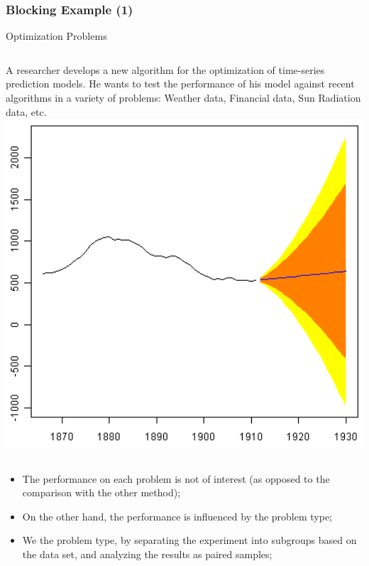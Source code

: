 \documentclass[10pt]{beamer}
\begin{document}
\begin{frame}
  \frametitle{Blocking Example (1)}
  \begin{block}{Optimization Problems}
    \begin{columns}[c]
      A researcher develops a new algorithm for the optimization of
      time-series prediction models. He wants to test the performance of
      his model against recent algorithms in a variety of problems:
      Weather data, Financial data, Sun Radiation data, etc.
      \includegraphics[width=1\textwidth]{img/timeseries}
    \end{columns}
  \end{block}
  \begin{itemize}
  \item The performance on each problem is not of interest (as opposed
    to the comparison with the other method);
  \item On the other hand, the performance is influenced by the
    problem type;
  \item We  the problem type, by separating the
    experiment into subgroups based on the data set, and analyzing the
    results as paired samples;
  \end{itemize}
\end{frame}
\end{document}
